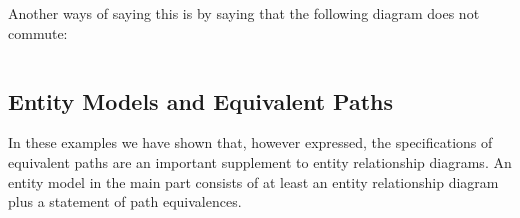 Another ways of saying this is by saying that the following diagram does not commute:
\begin{equation*}

\end{equation*}

\begin{equation*}

\end{equation*}


\subsection{Entity Models and Equivalent Paths}
\mynote
In these examples we have shown that, however expressed,  the specifications of equivalent paths are
an important supplement to entity relationship diagrams. 
An entity model in the main part consists of at least an entity relationship diagram  
plus a statement of path equivalences.

